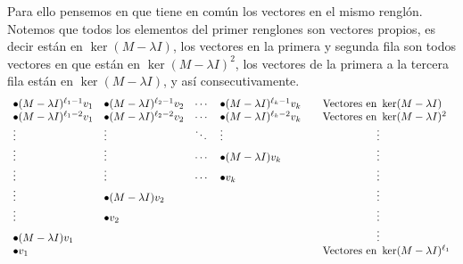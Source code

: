 Para ello pensemos en que tiene en común los vectores en el mismo renglón. Notemos que todos los elementos del primer renglones son vectores propios, es decir están en $\ker(M-\lambda I)$, los vectores en la primera y segunda fila son todos vectores en que están en $\ker(M-\lambda I)^2$, los vectores de la primera a la tercera fila están en $\ker(M-\lambda I)$, y así consecutivamente.
\[
  \begin{array}{llll@{\qquad}l} 
    \bullet (M-\lambda I)^{\ell_1-1}v_1 & \bullet (M-\lambda I)^{\ell_2-1}v_2 & \cdots & \bullet (M-\lambda I)^{\ell_k-1}v_k  & \text{Vectores en } \ker(M-\lambda I)\\
    \bullet (M-\lambda I)^{\ell_1-2}v_1 & \bullet (M-\lambda I)^{\ell_2-2}v_2 & \cdots & \bullet (M-\lambda I)^{\ell_k-2}v_k  & \text{Vectores en } \ker(M-\lambda I)^2 \\
    \vdots & \vdots & \ddots & \vdots &  \hspace{5em} \vdots \\
    \vdots & \vdots & \cdots & \bullet (M-\lambda I)v_k  & \hspace{5em}\vdots  \\
    \vdots & \vdots & \cdots & \bullet v_k  & \hspace{5em}\vdots  \\
    \vdots & \bullet (M-\lambda I)v_2  & & & \hspace{5em}\vdots \\
    \vdots & \bullet v_2  & &  & \hspace{5em}\vdots \\
    \bullet (M-\lambda I)v_1 & & & & \hspace{5em}\vdots \\
    \bullet v_1 & & & & \text{Vectores en } \ker(M-\lambda I)^{\ell_1}\\
  \end{array}
\]

